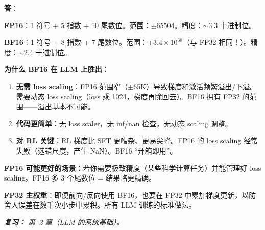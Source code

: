 \begin{questionbox}
\textbf{答}：

\textbf{FP16}：1 符号 + 5 指数 + 10 尾数位。范围：$\pm 65504$。精度：$\sim$3.3 十进制位。

\textbf{BF16}：1 符号 + 8 指数 + 7 尾数位。范围：$\pm 3.4 \times 10^{38}$（与 FP32 相同！）。精度：$\sim$2.4 十进制位。

\textbf{为什么 BF16 在 LLM 上胜出}：

\begin{enumerate}
  \item \textbf{无需 loss scaling}：FP16 范围窄（$\pm$65K）导致梯度和激活频繁溢出/下溢。需要动态 loss scaling（loss 乘 1024，梯度再除回去）。BF16 拥有 FP32 的范围——溢出基本不可能。
  \item \textbf{代码更简单}：无 loss scaler，无 inf/nan 检查，无动态 scaling 调整。
  \item \textbf{对 RL 关键}：RL 梯度比 SFT 更嘈杂、更易尖峰。FP16 的 loss scaling 经常失败（选错尺度，产生 NaN）。BF16 “开箱即用”。
\end{enumerate}

\textbf{FP16 可能更好的场景}：若你需要极致精度（某些科学计算任务）并能管理好 loss scaling。FP16 多 3 个尾数位 = 结果略更精确。

\textbf{FP32 主权重}：即便前向/反向使用 BF16，也要在 FP32 中累加梯度更新，以防舍入误差在数千次小步中累积。所有 LLM 训练的标准做法。

\emph{\textbf{复习：} 第~2 章（LLM 的系统基础）。}
\end{questionbox}

